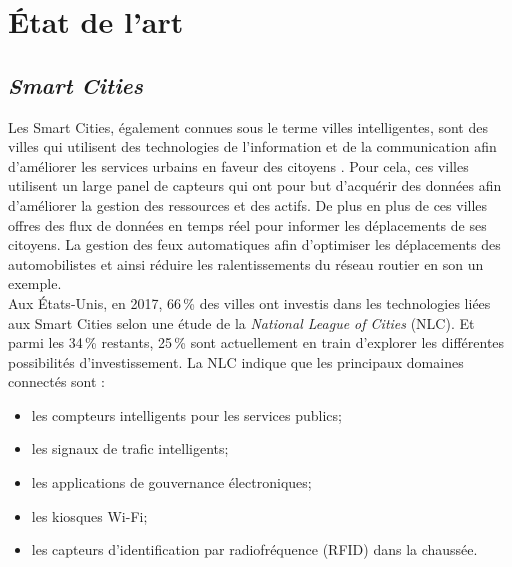 \chapter{État de l'art}
\label{2_state_of_the_art}


\section{\textit{Smart Cities}}

Les Smart Cities, également connues sous le terme villes intelligentes, sont des villes qui utilisent des technologies de l'information et de la communication afin d'améliorer les services urbains en faveur des citoyens \cite{Smartcit54:online}. Pour cela, ces villes utilisent un large panel de capteurs qui ont pour but d'acquérir des données afin d'améliorer la gestion des ressources et des actifs. De plus en plus de ces villes offres des flux de données en temps réel pour informer les déplacements de ses citoyens. La gestion des feux automatiques afin d'optimiser les déplacements des automobilistes et ainsi réduire les ralentissements du réseau routier en son un exemple. \\


Aux États-Unis, en 2017, 66\,\% des villes ont investis dans les technologies liées aux Smart Cities \cite{66ofUSci17:online} selon une étude de la \textit{National League of Cities} (NLC). Et parmi les 34\,\% restants, 25\,\% sont actuellement en train d'explorer les différentes possibilités d'investissement. La NLC indique que les principaux domaines connectés sont : 

\begin{itemize}
    \item les compteurs intelligents pour les services publics;
    \item les signaux de trafic intelligents;
    \item les applications de gouvernance électroniques;
    \item les kiosques Wi-Fi;
    \item les capteurs d'identification par radiofréquence (RFID) dans la chaussée.\\
\end{itemize}

